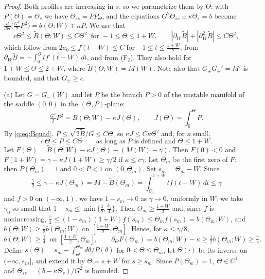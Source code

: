 \documentclass[11pt]{amsart}
\theoremstyle{definition}
\theoremstyle{remark}
\begin{document}
\begin{proof}
Both profiles are increasing in $s$, so we parametrize them by $\Theta$: with
$P(\Theta)=\Theta_s$ we have $\Theta_{ss}=PP_\Theta$, and the equations
$G^2\Theta_{ss}\pm\kappa\Theta_s=b$ become
$\frac{d}{d\Theta}\big(\frac{G^2}2P^2\big)=b(\Theta;W)\mp\kappa P$. We use that
\begin{equation}\label{q:eq:Bquad}
c\Theta^2\le\tilde B(\Theta;W)\le C\Theta^2\ \text{ for }-1\le\Theta\le1+W,\qquad
|\partial_W\tilde B|+|\partial^2_{W}\tilde B|\le C\Theta^2 ,
\end{equation}
which follow from $2a_0\le f(t-W)\le C$ for $-1\le t\le\frac{1+W}2$, from
$\partial_W\tilde B=-\int_0^\Theta tf'(t-W)\,dt$, and from (F$_2$). They also hold for
$1+W\le\Theta\le2+W$, where $\tilde B(\Theta;W)=M(W)$. Note also that
$G_\pm G_\pm'=M'$ is bounded, and that $G_\pm\ge c$.

\smallskip
(a) Let $G=G_-(W)$ and let $P$ be the branch $P>0$ of the unstable manifold of the saddle
$(0,0)$ in the $(\Theta,P)$-plane:
\begin{equation}\label{q:eq:Psup}
\tfrac{G^2}2P^2=\tilde B(\Theta;W)-\kappa J(\Theta),\qquad J(\Theta)=\int_0^\Theta P .
\end{equation}
By \eqref{q:eq:Bquad}, $P\le\sqrt{2\tilde B}/G\le C\Theta$, so $\kappa J\le C\kappa\Theta^2$ and, for
$\kappa$ small,
\begin{equation}\label{q:eq:Plin}
c\,\Theta\le P\le C\Theta\qquad\text{as long as $P$ is defined and }\Theta\le1+W .
\end{equation} Let $F(\Theta)=\tilde B(\Theta;W)-\kappa J(\Theta)-(M(W)-\gamma)$. Then $F(0)<0$ and
$F(1+W)=\gamma-\kappa J(1+W)\ge\gamma/2$ if $\kappa\le c\gamma$. Let $\Theta_m$ be the first
zero of $F$: then $P(\Theta_m)=1$ and $0<P<1$ on $(0,\Theta_m)$. Set $s_m=\Theta_m-W$.
Since
\[
\tfrac\gamma2\le\gamma-\kappa J(\Theta_m)=M-\tilde B(\Theta_m)=\int_{\Theta_m}^{1+W}tf(t-W)\,dt\le\gamma
\]
and $f>0$ on $(-\infty,1)$, we have $1-s_m\to0$ as $\gamma\to0$, uniformly in $W$; we take
$\gamma_0$ so small that $1-s_m\le\min\{\frac12,\frac{\delta_1}4\}$. Then
$\Theta_m\ge\frac{1+W}2$ and, since $f$ is nonincreasing,
$\frac\gamma2\le(1-s_m)(1+W)f(s_m)\le\Theta_mf(s_m)=b(\Theta_m;W)$, and
$b(\Theta;W)\ge\frac12b(\Theta_m;W)$ on $[\frac{1+W}2,\Theta_m]$. Hence, for $\kappa\le\gamma/8$,
\begin{equation}\label{q:eq:top}
b(\Theta;W)\ge\tfrac\gamma4\ \text{ on }[\tfrac{1+W}2,\Theta_m],\qquad
\partial_\Theta F(\Theta_m)=b(\Theta_m;W)-\kappa\ge\tfrac12b(\Theta_m;W)\ge\tfrac\gamma4 .
\end{equation}
Define $s(\Theta)=s_m-\int_\Theta^{\Theta_m}d\theta/P(\theta)$ for $0<\Theta\le\Theta_m$, let
$\Theta(\cdot)$ be its inverse on $(-\infty,s_m]$, and extend it by $\Theta=s+W$ for $s\ge s_m$.
Since $P(\Theta_m)=1$, $\Theta\in C^1$, and $\Theta_{ss}=(b-\kappa\Theta_s)/G^2$ is bounded.


\end{proof}
\end{document}
